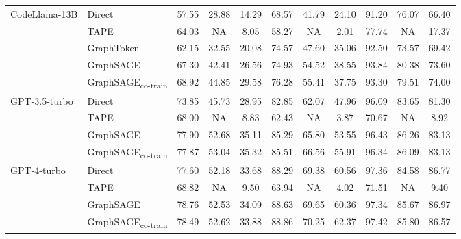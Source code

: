\documentclass[11pt,UTF8,fontset=fandol]{ctexart}
\begin{document}
\begin{table}[H]
\begin{tabular}{llccc ccc ccc}
\midrule
\multirow{5}{*}{CodeLlama-13B}
& Direct & 57.55 & 28.88 & 14.29 & 68.57 & 41.79 & 24.10 & 91.20 & 76.07 & 66.40\\
& TAPE & 64.03 & NA & 8.05 & 58.27 & NA & 2.01 & 77.74 & NA & 17.37\\
& GraphToken & 62.15 & 32.55 & 20.08 & 74.57 & 47.60 & 35.06 & 92.50 & 73.57 & 69.42\\
& GraphSAGE & 67.30 & 42.41 & 26.56 & 74.93 & 54.52 & 38.55 & 93.84 & 80.38 & 73.60\\
& GraphSAGE\textsubscript{co-train} & 68.92 & 44.85 & 29.58 & 76.28 & 55.41 & 37.75 & 93.30 & 79.51 & 74.00\\
\midrule
\multirow{4}{*}{GPT-3.5-turbo}
& Direct & 73.85 & 45.73 & 28.95 & 82.85 & 62.07 & 47.96 & 96.09 & 83.65 & 81.30\\
& TAPE & 68.00 & NA & 8.83 & 62.43 & NA & 3.87 & 70.67 & NA & 8.92\\
& GraphSAGE & 77.90 & 52.68 & 35.11 & 85.29 & 65.80 & 53.55 & 96.43 & 86.26 & 83.13\\
& GraphSAGE\textsubscript{co-train} & 77.87 & 53.04 & 35.32 & 85.51 & 66.56 & 55.91 & 96.34 & 86.09 & 83.13\\
\midrule
\multirow{4}{*}{GPT-4-turbo}
& Direct & 77.60 & 52.18 & 33.68 & 88.29 & 69.38 & 60.56 & 97.36 & 84.58 & 86.77\\
& TAPE & 68.82 & NA & 9.50 & 63.94 & NA & 4.02 & 71.51 & NA & 9.40\\
& GraphSAGE & 78.76 & 52.53 & 34.09 & 88.63 & 69.65 & 60.36 & 97.34 & 85.67 & 86.97\\
& GraphSAGE\textsubscript{co-train} & 78.49 & 52.62 & 33.88 & 88.86 & 70.25 & 62.37 & 97.42 & 85.80 & 86.57\\
\bottomrule
\end{tabular}
\end{table}
\end{document}
